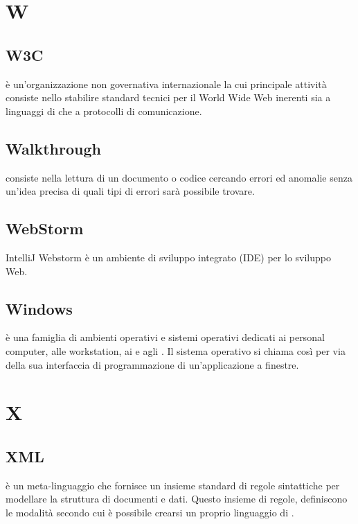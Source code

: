 \documentclass[12pt,a4paper]{article}
\begin{document}
\section{W}


\subsection{W3C} 
è un'organizzazione non governativa internazionale la cui principale attività  consiste nello stabilire standard tecnici per il World Wide Web inerenti sia a linguaggi di  che a protocolli di comunicazione.

\subsection{Walkthrough} 
consiste nella lettura di un documento o codice cercando errori ed anomalie senza un'idea precisa di quali tipi di errori sarà possibile trovare.

\subsection{WebStorm}
IntelliJ Webstorm è un ambiente di sviluppo integrato (IDE) per lo sviluppo Web.

\subsection{Windows} 
è una famiglia di ambienti operativi e sistemi operativi dedicati ai personal computer, alle workstation, ai  e agli . Il sistema operativo si chiama così per via della sua interfaccia di programmazione di un'applicazione a finestre.


\newpage

\section{X}


\subsection{XML} 
è un meta-linguaggio che fornisce un insieme standard di regole sintattiche per modellare la struttura di documenti e dati. Questo insieme di regole, definiscono le modalità secondo cui è possibile crearsi un proprio linguaggio di  .
\end{document}
